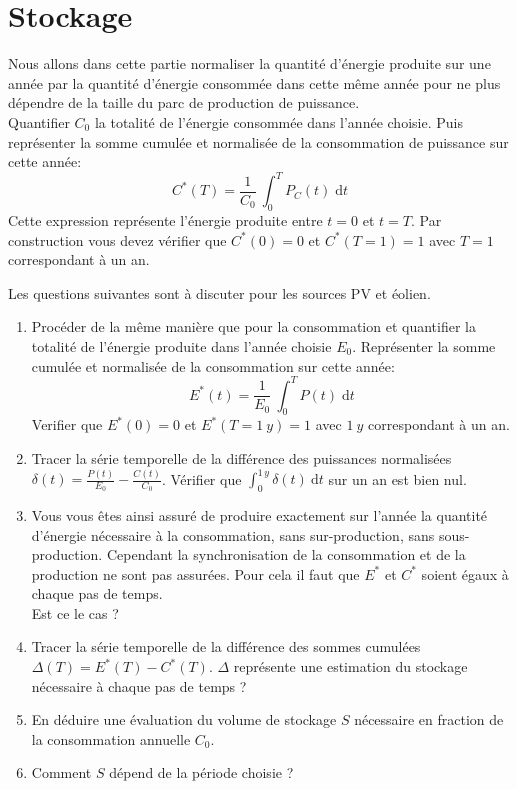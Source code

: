 \documentclass[12pt,a4]{article}
\begin{document}
\section{Stockage}
Nous allons dans cette partie normaliser la quantité d'énergie produite sur une année par la quantité d'énergie consommée dans cette même année pour ne plus dépendre de la taille du parc de production de puissance. \\
Quantifier $C_0$ la totalité de l'énergie consommée dans l'année choisie. Puis  représenter la somme cumulée et normalisée de la consommation de puissance sur cette année:
\begin{equation}
	C^*(T)  = \frac{1}{C_0} ~ \int_{0}^{T}P_C(t) \; \text{d} t	
\end{equation}
Cette expression représente l'énergie produite entre $t=0$ et $t=T$. Par construction vous devez vérifier que $C^*(0)=0$ et $C^*(T=1)=1$ avec $T=1$ correspondant à un an. 


Les questions suivantes sont à discuter pour les sources PV et éolien.
\begin{enumerate}
	\item Procéder de la même manière que pour la consommation et quantifier la totalité de l'énergie produite dans l'année choisie $E_0$. Représenter la somme cumulée et normalisée de la consommation sur cette année: 
	\begin{equation}
		E^*(t)  = \frac{1}{E_0} ~ \int_{0}^{T} P(t) \; \text{d} t	
	\end{equation}
	Verifier que $E^*(0)=0$ et $E^*(T=1~y)=1$ avec $1~y$ correspondant à un an. 
	
	\item Tracer la série temporelle de la différence des puissances normalisées $\delta(t) = \frac{P(t)}{E_0} - \frac{C(t)}{C_0}$. Vérifier que $\int_0^{1\,y} \delta(t) ~ \text{d} t $ sur un an est bien nul.
	
	\item Vous vous êtes ainsi assuré de produire exactement sur l'année la quantité d'énergie nécessaire à la consommation, sans sur-production, sans sous-production. Cependant la synchronisation de la consommation et de la production ne sont pas assurées. Pour cela il faut que $E^*$ et $C^*$ soient égaux à chaque pas de temps.\\ Est ce le cas ? 
	
	\item Tracer la série temporelle de la différence des sommes cumulées $\Delta(T) = E^*(T) - C^*(T)$. $\Delta $ représente une estimation du stockage nécessaire à chaque pas de temps ?
	
	\item En déduire une évaluation du volume de stockage $S$ nécessaire en fraction de la consommation annuelle $C_0$.
	
	\item Comment $S$ dépend de la période choisie ?
	
\end{enumerate}
\end{document}
